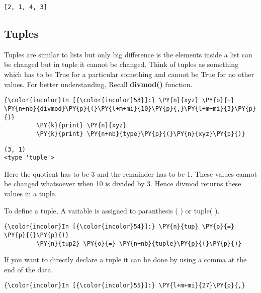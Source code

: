     \begin{Verbatim}[commandchars=\\\{\}]
[2, 1, 4, 3]
    \end{Verbatim}

    \subsection{Tuples}\label{tuples}

    Tuples are similar to lists but only big difference is the elements
inside a list can be changed but in tuple it cannot be changed. Think of
tuples as something which has to be True for a particular something and
cannot be True for no other values. For better understanding, Recall
\textbf{divmod()} function.

    \begin{Verbatim}[commandchars=\\\{\}]
{\color{incolor}In [{\color{incolor}53}]:} \PY{n}{xyz} \PY{o}{=} \PY{n+nb}{divmod}\PY{p}{(}\PY{l+m+mi}{10}\PY{p}{,}\PY{l+m+mi}{3}\PY{p}{)}
         \PY{k}{print} \PY{n}{xyz}
         \PY{k}{print} \PY{n+nb}{type}\PY{p}{(}\PY{n}{xyz}\PY{p}{)}
\end{Verbatim}

    \begin{Verbatim}[commandchars=\\\{\}]
(3, 1)
<type 'tuple'>
    \end{Verbatim}

    Here the quotient has to be 3 and the remainder has to be 1. These
values cannot be changed whatsoever when 10 is divided by 3. Hence
divmod returns these values in a tuple.

    To define a tuple, A variable is assigned to paranthesis ( ) or tuple(
).

    \begin{Verbatim}[commandchars=\\\{\}]
{\color{incolor}In [{\color{incolor}54}]:} \PY{n}{tup} \PY{o}{=} \PY{p}{(}\PY{p}{)}
         \PY{n}{tup2} \PY{o}{=} \PY{n+nb}{tuple}\PY{p}{(}\PY{p}{)}
\end{Verbatim}

    If you want to directly declare a tuple it can be done by using a comma
at the end of the data.

    \begin{Verbatim}[commandchars=\\\{\}]
{\color{incolor}In [{\color{incolor}55}]:} \PY{l+m+mi}{27}\PY{p}{,}
\end{Verbatim}

